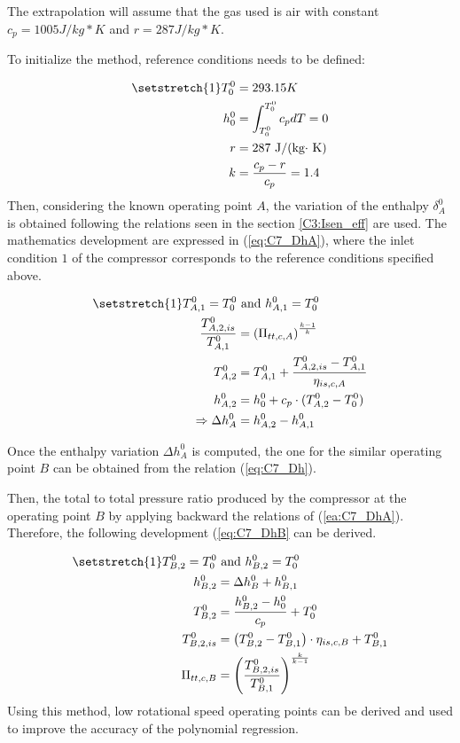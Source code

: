 The extrapolation will assume that the gas used is air with constant
$c_p=1005 J/kg*K$ and $r = 287 J/kg*K$. 

To initialize the method, reference conditions needs to be defined:

\begin{align*}
    \setstretch{1}
    T_{0}^0 & = 293.15K\\
    h_{0}^0 & = \int_{T_{0}^0}^{T_{0}^0} c_p dT = 0\\
    r & = 287 \text{ J/(kg$\cdot$ K)}\\
    k &= \frac{c_p - r}{c_p} = 1.4
\end{align*}
Then, considering the known operating point $A$, the variation of the enthalpy $\delta_{A}^0$ is obtained  following the relations seen in the section \ref{C3:Isen_eff} are used. The mathematics development are expressed in (\ref{eq:C7_DhA}), where the inlet condition $1$ of the compressor corresponds to the reference conditions specified above.

\begin{align}
\setstretch{1}
    T_{A,1}^0 = T_{0}^0 &\text{ and } h_{A,1}^0 = T_{0}^0\nonumber\\
    \frac{T_{A,2,is}^0}{T_{A,1}^0} &= \left(\Pi_{tt,c,A}\right)^{\frac{k-1}{k}}\nonumber\\
    T_{A,2}^0 &= T_{A,1}^0 + \frac{T_{A,2,is}^0 - T_{A,1}^0}{\eta_{is,c,A}}\label{eq:C7_DhA}\\
    h_{A,2}^0 &= h_{0}^0 + c_p\cdot (T_{A,2}^0 - T_{0}^0)\nonumber\\
    \Rightarrow \Delta h_A^0 &= h_{A,2}^0  - h_{A,1}^0\nonumber
\end{align}

Once the enthalpy variation $\Delta h_A^0$ is computed, the one for the similar operating point $B$ can be obtained from the relation (\ref{eq:C7_Dh}).

Then, the total to total pressure ratio produced by the compressor at the operating point $B$ by applying backward the relations of (\ref{ea:C7_DhA}). Therefore, the following development (\ref{eq:C7_DhB} can be derived.

\begin{align}
\setstretch{1}
    T_{B,2}^0 = T_{0}^0 &\text{ and } h_{B,2}^0 = T_{0}^0\nonumber\\
    h_{B,2}^0 &= \Delta h_B^0 + h_{B,1}^0\nonumber\\
    T_{B,2}^0 &= \frac{h_{B,2}^0 - h_{0}^0}{c_p} + T_0^0\label{eq:C7_DhB}\\
    T_{B,2,is}^0 &= \left(T_{B,2}^0 - T_{B,1}^0\right)\cdot \eta_{is,c,B} + T_{B,1}^0\nonumber\\
    \Pi_{tt,c,B} &= \left(\frac{T_{B,2,is}^0}{T_{B,1}^0}\right)^{\frac{k}{k-1}}\nonumber
\end{align}
Using this method, low rotational speed operating points can be derived and used to improve the accuracy of the polynomial regression.

